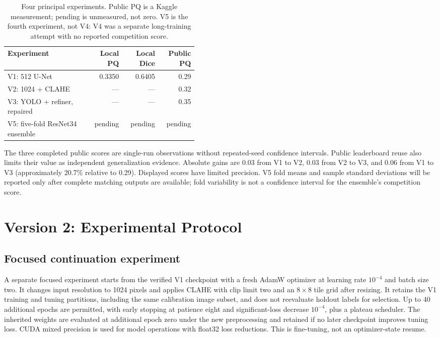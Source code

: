 \documentclass[sigconf]{acmart}
\begin{document}
\begin{table}[t]
\centering
\caption{Four principal experiments. Public PQ is a Kaggle measurement;
pending is unmeasured, not zero. V5 is the fourth experiment, not V4:
V4 was a separate long-training attempt with no reported competition score.}
\label{tab:pending}
\setlength{\tabcolsep}{3pt}
\begin{tabular}{@{}p{0.44\linewidth}rrr@{}}
\hline
Experiment & Local PQ & Local Dice & Public PQ\\
\hline
V1: 512 U-Net & 0.3350 & 0.6405 & 0.29\\
V2: 1024 + CLAHE & --- & --- & 0.32\\
V3: YOLO + refiner, repaired & --- & --- & 0.35\\
V5: five-fold ResNet34 ensemble & pending & pending & pending\\
\hline
\end{tabular}
\end{table}
The three completed public scores are single-run observations without
repeated-seed confidence intervals. Public leaderboard reuse also limits
their value as independent generalization evidence. Absolute gains are
0.03 from V1 to V2, 0.03 from V2 to V3, and 0.06 from V1 to V3
(approximately 20.7\% relative to 0.29). Displayed scores have limited
precision. V5 fold means and sample standard deviations will be reported
only after complete matching outputs are available; fold variability is
not a confidence interval for the ensemble's competition score.

\section{Version 2: Experimental Protocol}\label{sec:v2}
\subsection{Focused continuation experiment}
A separate focused experiment starts from the verified V1 checkpoint
with a fresh AdamW optimizer at learning rate $10^{-4}$ and batch size
two. It changes input resolution to 1024 pixels and applies CLAHE with
clip limit two and an $8\times8$ tile grid after resizing. It retains
the V1 training and tuning partitions, including the same calibration
image subset, and does not reevaluate holdout labels for selection.
Up to 40 additional epochs are permitted, with early stopping at patience
eight and significant-loss decrease $10^{-4}$, plus a plateau scheduler.
The inherited weights are evaluated at additional epoch zero under the
new preprocessing and retained if no later checkpoint improves tuning loss.
CUDA mixed precision is used for model operations with float32 loss
reductions. This is fine-tuning, not an optimizer-state resume.
\end{document}
